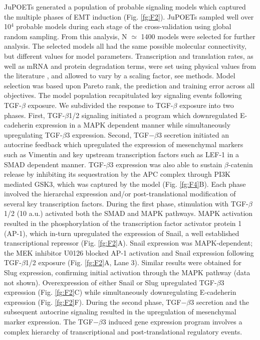\documentclass[11pt,letterpaper]{article}
\begin{document}
JuPOETs generated a population of probable signaling models which captured the multiple phases of EMT induction (Fig. \ref{fg:F2}).
JuPOETs sampled well over 10$^4$ probable models during each stage of the cross-validation using global random sampling.
From this analysis, N $\simeq$ 1400 models were selected for further analysis.
The selected models all had the same possible molecular connectivity, but different values for model parameters.
Transcription and translation rates, as well as mRNA and protein degradation terms, were set using physical values from the literature \cite{Milo:2010aa},
and allowed to vary by a scaling factor, see methods.
Model selection was based upon Pareto rank, the prediction and training error across all objectives.
The model population recapitulated key signaling events following TGF-$\beta$ exposure.
We subdivided the response to TGF-$\beta$ exposure into two phases.
First, TGF-$\beta$1/2 signaling initiated a program which downregulated E-cadeherin expression in a MAPK dependent manner while
simultaneously upregulating TGF-$\beta$3 expression. Second, TGF$-\beta$3 secretion initiated an autocrine feedback which upregulated the expression of
mesenchymal markers such as Vimentin and key upstream transcription factors such as LEF-1 in a SMAD dependent manner.
TGF-$\beta$3 expression was also able to sustain $\beta$-catenin release by inhibiting its sequestration by the APC complex through PI3K mediated GSK3,
which was captured by the model (Fig. \ref{fg:F4}B).
Each phase involved the hierarchal expression and/or post-translational modification of several key transcription factors.
During the first phase, stimulation with TGF-$\beta$1/2 (10 a.u.) activated both the SMAD and MAPK pathways.
MAPK activation resulted in the phosphorylation of the transcription factor activator protein 1 (AP-1), which in-turn upregulated the expression of Snail, a well established transcriptional repressor (Fig. \ref{fg:F2}A).
Snail expression was MAPK-dependent; the MEK inhibitor U0126 blocked AP-1 activation and Snail expression following TGF-$\beta$1/2 exposure (Fig. \ref{fg:F2}A, Lane 3).
Similar results were obtained for Slug expression, confirming initial activation through the MAPK pathway (data not shown).
Overexpression of either Snail or Slug upregulated TGF-$\beta$3 expression (Fig. \ref{fg:F2}C) while simultaneously downregulating E-cadeherin expression (Fig. \ref{fg:F2}F).
During the second phase, TGF$-\beta$3 secretion and the subsequent autocrine signaling resulted in the upregulation of mesenchymal marker expression.
The TGF$-\beta$3 induced gene expression program involves a complex hierarchy of transcriptional and post-translational regulatory events.
\end{document}
